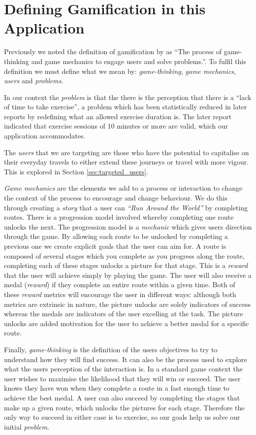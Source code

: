 \section{Defining Gamification in this Application}

Previously we noted the definition of gamification by
\citet{gamification_book} as ``The process of
game-thinking and game mechanics to engage users and solve
problems.''. To fulfil this definition we must define what we mean
by: \emph{game-thinking}, \emph{game mechanics}, \emph{users} and
\emph{problems}. 

In our context the \emph{problem} is that the there is the perception
that there is a ``lack of time to take exercise''\cite{exercise}, a
problem which has been statistically reduced in later reports by
redefining what an allowed exercise duration
is\cite{exercise_2012}. The later report indicated that exercise
sessions of 10 minutes or more are valid, which our application
accommodates. 

The \emph{users} that we are targeting are those who have the
potential to capitalise on their everyday travels to either extend
these journeys or travel with more vigour. This is explored in Section
\ref{sec:targeted_users}.  

\emph{Game mechanics} are the elements we add to a process or
interaction to change the context of the process to encourage
and change behaviour. We do this through creating a \emph{story} that
a user can \emph{``Run Around the World''} by completing
routes. There is a progression model involved whereby completing one
route unlocks the next. The progression model is a \emph{mechanic}
which gives users direction through the game. By allowing each route
to be unlocked by completing a previous one we create explicit goals
that the user can aim for. A route is composed of several stages which
you complete as you progress along the route, completing each of these
stages unlocks a picture for that stage. This is a \emph{reward} that
the user will achieve simply by playing the game. The user will also
receive a medal (\emph{reward}) if they complete an entire route
within a given time. Both of these \emph{reward} metrics will
encourage the user in different ways: although both metrics are
extrinsic in nature, the picture unlocks are solely indicators of
success whereas the medals are indicators of the user excelling at the
task. The picture unlocks are added motivation for the user to achieve
a better medal for a specific route.

Finally, \emph{game-thinking} is the definition of the users
objectives to try to understand how they will find success. It can
also be the process used to explore what the users perception of the
interaction is. In a standard game context the user wishes to maximise
the likelihood that they will win or succeed. The user knows they have
won when they complete a route in a fast enough time to achieve
the best medal. A user can also succeed by completing the stages that
make up a given route, which unlocks the pictures for each
stage. Therefore the only way to succeed in either case is to
exercise, so our goals help us solve our initial \emph{problem}.

